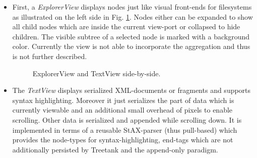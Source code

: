 \begin{itemize}
\item
First, a \emph{ExplorerView} displays nodes just like visual front-ends for filesystems as illustrated on the left side in Fig. \ref{fig:treetextview}. Nodes either can be expanded to show all child nodes which are inside the current view-port or collapsed to hide children. The visible subtree of a selected node is marked with a background color. Currently the view is not able to incorporate the aggregation and thus is not further described.

\begin{figure}[tb]
\caption{\label{fig:treetextview} ExplorerView and TextView side-by-side.}
\end{figure}

\item
The \emph{TextView} displays serialized XML-documents or fragments and supports syntax highlighting. Moreover it just serializes the part of data which is currently viewable and an additional small overhead of pixels to enable scrolling. Other data is serialized and appended while scrolling down. It is implemented in terms of a reusable StAX-parser (thus pull-based) which provides the node-types for syntax-highlighting, end-tags which are not additionally persisted by Treetank and the append-only paradigm.%


\end{itemize}
